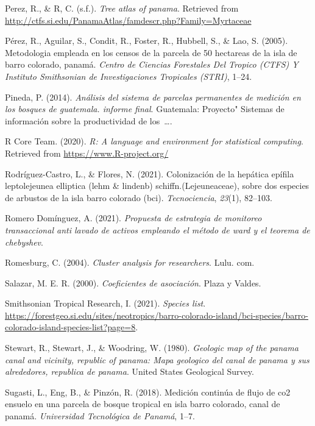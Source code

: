 \documentclass[11pt,]{article}
\begin{document}
\hypertarget{ref-pereztree}{}
Perez, R., \& R, C. (s.f.). \emph{Tree atlas of panama}. Retrieved from
\url{http://ctfs.si.edu/PanamaAtlas/famdescr.php?Family=Myrtaceae}

\hypertarget{ref-perez2005metodologia}{}
Pérez, R., Aguilar, S., Condit, R., Foster, R., Hubbell, S., \& Lao, S.
(2005). Metodologia empleada en los censos de la parcela de 50 hectareas
de la isla de barro colorado, panamá. \emph{Centro de Ciencias
Forestales Del Tropico (CTFS) Y Instituto Smithsonian de Investigaciones
Tropicales (STRI)}, 1--24.

\hypertarget{ref-pineda2014analisis}{}
Pineda, P. (2014). \emph{Análisis del sistema de parcelas permanentes de
medición en los bosques de guatemala. informe final}. Guatemala:
Proyecto" Sistemas de información sobre la productividad de
los~\ldots{}.

\hypertarget{ref-R2020ALanguage}{}
R Core Team. (2020). \emph{R: A language and environment for statistical
computing}. Retrieved from \url{https://www.R-project.org/}

\hypertarget{ref-rodriguez2021colonizacion}{}
Rodríguez-Castro, L., \& Flores, N. (2021). Colonización de la hepática
epífila leptolejeunea elliptica (lehm \& lindenb)
schiffn.(Lejeuneaceae), sobre dos especies de arbustos de la isla barro
colorado (bci). \emph{Tecnociencia}, \emph{23}(1), 82--103.

\hypertarget{ref-romero2021propuesta}{}
Romero Domínguez, A. (2021). \emph{Propuesta de estrategia de monitoreo
transaccional anti lavado de activos empleando el método de ward y el
teorema de chebyshev}.

\hypertarget{ref-romesburg2004cluster}{}
Romesburg, C. (2004). \emph{Cluster analysis for researchers}. Lulu.
com.

\hypertarget{ref-salazar2000coeficientes}{}
Salazar, M. E. R. (2000). \emph{Coeficientes de asociación}. Plaza y
Valdes.

\hypertarget{ref-smithss2021spec}{}
Smithsonian Tropical Research, I. (2021). \emph{Species list}.
\url{https://forestgeo.si.edu/sites/neotropics/barro-colorado-island/bci-species/barro-colorado-island-species-list?page=8}.

\hypertarget{ref-stewart1980geologic}{}
Stewart, R., Stewart, J., \& Woodring, W. (1980). \emph{Geologic map of
the panama canal and vicinity, republic of panama: Mapa geologico del
canal de panama y sus alrededores, republica de panama}. United States
Geological Survey.

\hypertarget{ref-sugasti2018medicion}{}
Sugasti, L., Eng, B., \& Pinzón, R. (2018). Medición continúa de flujo
de co2 ensuelo en una parcela de bosque tropical en isla barro colorado,
canal de panamá. \emph{Universidad Tecnológica de Panamá}, 1--7.
\end{document}
